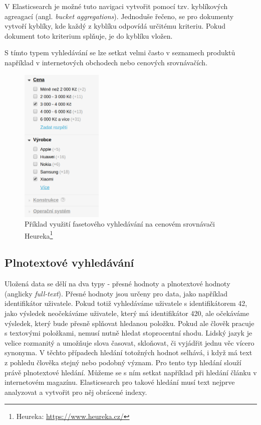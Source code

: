 V Elasticsearch je možné tuto navigaci vytvořit pomocí tzv. kyblíkových agreagací (angl. \emph{bucket aggregations}).
Jednoduše řečeno, se pro dokumenty vytvoří kyblíky, kde každý z kyblíku odpovídá určitému kriteriu. Pokud dokument toto kriterium splňuje, je do kyblíku vložen.

S tímto typem vyhledávání se lze setkat velmi často v seznamech produktů například v internetových obchodech nebo cenových srovnávačích.

\begin{figure}[H]
	\centering
	\includegraphics[width=0.35\textwidth]{images/heureka-facet.png}
	\caption{Příklad využití fasetového vyhledávání na cenovém srovnávači Heureka\footnote{Heureka: \url{https://www.heureka.cz/}}}
\end{figure}


\subsection{Plnotextové vyhledávání}
Uložená data se dělí na dva typy - přesné hodnoty a plnotextové hodnoty (anglicky \emph{full-text}). Přesné hodnoty jsou určeny pro data, jako například identifikátor uživatele. Pokud totiž vyhledáváme uživatele s identifikátorem 42, jako výsledek neočekáváme uživatele, který má identifikátor 420, ale očekáváme výsledek, který bude přesně splňovat hledanou položku.
Pokud ale člověk pracuje s textovými položkami, nemusí nutně hledat stoprocentní shodu. Lidský jazyk je velice rozmanitý a umožňuje slova časovat, skloňovat, či vyjádřit jednu věc vícero synonyma. %
V těchto případech hledání totožných hodnot selhává, i když má text z pohledu člověka stejný nebo podobný význam. Pro tento typ hledání slouží právě plnotextové hledání. Můžeme se s ním setkat například při hledání článku v internetovém magazínu.
Elasticsearch pro takové hledání musí text nejprve analyzovat a vytvořit pro něj obrácené indexy.

